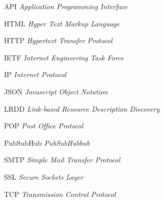 \begin{siglas}
  \item[API]       \textit{Application Programming Interface}
  \item[HTML]      \textit{Hyper Text Markup Language}
  \item[HTTP]      \textit{Hypertext Transfer Protocol}
  \item[IETF]      \textit{Internet Engineering Task Force}
  \item[IP]        \textit{Internet Protocol}
  \item[JSON]      \textit{Javascript Object Notation}
  \item[LRDD]      \textit{Link-based Resource Description Discovery}
  \item[POP]       \textit{Post Office Protocol}
  \item[PubSubHub] \textit{PubSubHubbub}
  \item[SMTP]      \textit{Simple Mail Transfer Protocol}
  \item[SSL]       \textit{Secure Sockets Layer}
  \item[TCP]       \textit{Transmission Control Protocol}
\end{siglas}
